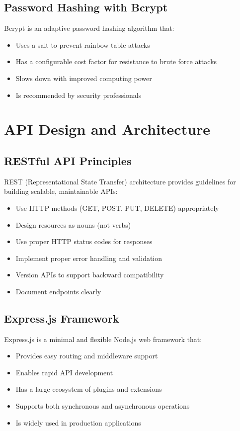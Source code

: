 \subsection{Password Hashing with Bcrypt}

Bcrypt is an adaptive password hashing algorithm that:

\begin{itemize}
    \item Uses a salt to prevent rainbow table attacks
    \item Has a configurable cost factor for resistance to brute force attacks
    \item Slows down with improved computing power
    \item Is recommended by security professionals
\end{itemize}

\section{API Design and Architecture}

\subsection{RESTful API Principles}

REST (Representational State Transfer) architecture provides guidelines for building scalable, maintainable APIs:

\begin{itemize}
    \item Use HTTP methods (GET, POST, PUT, DELETE) appropriately
    \item Design resources as nouns (not verbs)
    \item Use proper HTTP status codes for responses
    \item Implement proper error handling and validation
    \item Version APIs to support backward compatibility
    \item Document endpoints clearly
\end{itemize}

\subsection{Express.js Framework}

Express.js is a minimal and flexible Node.js web framework that:

\begin{itemize}
    \item Provides easy routing and middleware support
    \item Enables rapid API development
    \item Has a large ecosystem of plugins and extensions
    \item Supports both synchronous and asynchronous operations
    \item Is widely used in production applications
\end{itemize}

